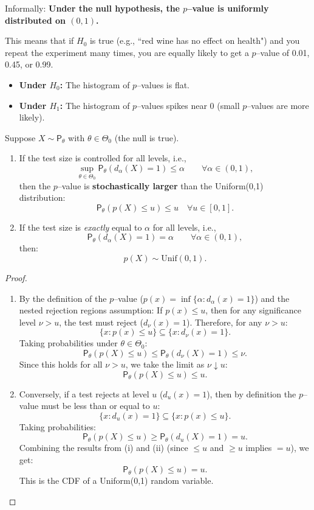 Informally: \textbf{Under the null hypothesis, the \(p\)--value is uniformly distributed on $(0,1)$.}

This means that if $H_0$ is true (e.g., ``red wine has no effect on health") and you repeat the experiment many times, you are equally likely to get a \(p\)--value of 0.01, 0.45, or 0.99.
\begin{itemize}
    \item \textbf{Under $H_0$:} The histogram of \(p\)--values is flat.
    \item \textbf{Under $H_1$:} The histogram of \(p\)--values spikes near 0 (small \(p\)--values are more likely).
\end{itemize}

\begin{lemma}
Suppose $X \sim \mathsf{P}_{\theta}$ with $\theta \in \Theta_0$ (the null is true).

\begin{enumerate}
    \item[(i)] If the test size is controlled for all levels, i.e.,
    \[ \sup_{\theta \in \Theta_0} \mathsf{P}_{\theta}(d_{\alpha}(X) = 1) \leq \alpha \qquad \forall \alpha \in (0,1), \]
    then the \(p\)--value is \textbf{stochastically larger} than the Uniform(0,1) distribution:
    \[ \mathsf{P}_{\theta}(p(X) \le u) \le u \quad \forall u \in [0, 1]. \]

    \item[(ii)] If the test size is \textit{exactly} equal to $\alpha$ for all levels, i.e.,
    \[ \mathsf{P}_{\theta}(d_{\alpha}(X) = 1) = \alpha \qquad \forall \alpha \in (0, 1), \]
    then:
    \[ p(X) \sim \text{Unif}(0, 1). \]
\end{enumerate}
\end{lemma}

\begin{proof}
    \leavevmode
        \begin{enumerate}[label=\roman*)]
            \item 
By the definition of the \(p\)--value ($p(x) = \inf\{\alpha : d_\alpha(x)=1\}$) and the nested rejection regions assumption:
If $p(x) \le u$, then for any significance level $\nu > u$, the test must reject ($d_\nu(x) = 1$).
Therefore, for any $\nu > u$:
\[ \{ x : p(x) \le u \} \subseteq \{ x : d_\nu(x) = 1 \}. \]
Taking probabilities under $\theta \in \Theta_0$:
\[ \mathsf{P}_{\theta}(p(X) \le u) \le \mathsf{P}_{\theta}(d_{\nu}(X) = 1) \le \nu. \]
Since this holds for all $\nu > u$, we take the limit as $\nu \downarrow u$:
\[ \mathsf{P}_{\theta}(p(X) \le u) \le u. \]

\item 
Conversely, if a test rejects at level $u$ ($d_u(x) = 1$), then by definition the \(p\)--value must be less than or equal to $u$:
\[ \{ x : d_u(x) = 1 \} \subseteq \{ x : p(x) \le u \}. \]
Taking probabilities:
\[ \mathsf{P}_{\theta}(p(X) \le u) \ge \mathsf{P}_{\theta}(d_u(X) = 1) = u. \]
Combining the results from (i) and (ii) (since $\le u$ and $\ge u$ implies $= u$), we get:
\[ \mathsf{P}_{\theta}(p(X) \le u) = u. \]
This is the CDF of a Uniform(0,1) random variable.
        \end{enumerate}
\end{proof}

